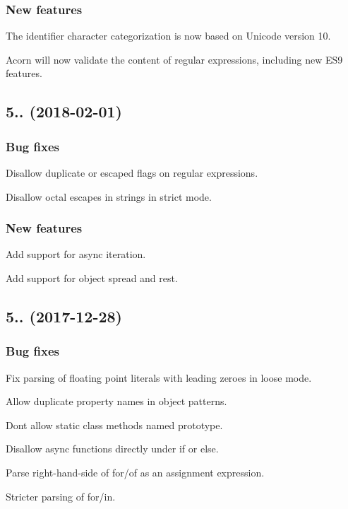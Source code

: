 \subsubsection*{New features}

The identifier character categorization is now based on Unicode version 10.

Acorn will now validate the content of regular expressions, including new E\+S9 features.

\subsection*{5.. (2018-\/02-\/01)}

\subsubsection*{Bug fixes}

Disallow duplicate or escaped flags on regular expressions.

Disallow octal escapes in strings in strict mode.

\subsubsection*{New features}

Add support for async iteration.

Add support for object spread and rest.

\subsection*{5.. (2017-\/12-\/28)}

\subsubsection*{Bug fixes}

Fix parsing of floating point literals with leading zeroes in loose mode.

Allow duplicate property names in object patterns.

Don\textquotesingle{}t allow static class methods named {\ttfamily prototype}.

Disallow async functions directly under {\ttfamily if} or {\ttfamily else}.

Parse right-\/hand-\/side of {\ttfamily for}/{\ttfamily of} as an assignment expression.

Stricter parsing of {\ttfamily for}/{\ttfamily in}.

